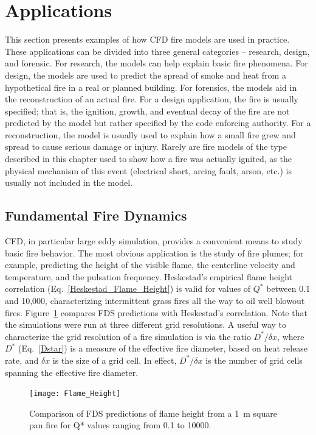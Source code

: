 \documentclass[graybox]{svmult}
\begin{document}
\section{Applications}

This section presents examples of how CFD fire models are used in practice. These applications can be divided into three general categories -- research, design, and forensic. For research, the models can help explain basic fire phenomena. For design, the models are used to predict the spread of smoke and heat from a hypothetical fire in a real or planned building. For forensics, the models aid in the reconstruction of an actual fire. For a design application, the fire is usually specified; that is, the ignition, growth, and eventual decay of the fire are not predicted by the model but rather specified by the code enforcing authority. For a reconstruction, the model is usually used to explain how a small fire grew and spread to cause serious damage or injury. Rarely are fire models of the type described in this chapter used to show how a fire was actually ignited, as the physical mechanism of this event (electrical short, arcing fault, arson, etc.) is usually not included in the model.

\subsection{Fundamental Fire Dynamics}

CFD, in particular large eddy simulation, provides a convenient means to study basic fire behavior. The most obvious application is the study of fire plumes; for example, predicting the height of the visible flame, the centerline velocity and temperature, and the pulsation frequency. Heskestad's empirical flame height correlation (Eq.~\ref{Heskestad_Flame_Height}) is valid for values of  $Q^*$ between 0.1 and 10,000, characterizing intermittent grass fires all the way to oil well blowout fires. Figure~\ref{Flame_Height} compares FDS predictions with Heskestad's correlation. Note that the simulations were run at three different grid resolutions. A useful way to characterize the grid resolution of a fire simulation is via the ratio $D^*/\delta x$, where $D^*$ (Eq.~\ref{Dstar}) is a measure of the effective fire diameter, based on heat release rate, and $\delta x$ is the size of a grid cell. In effect, $D^*/\delta x$ is the number of grid cells spanning the effective fire diameter.
\begin{figure}[ht]
\begin{center}
\texttt{[image: Flame\_Height]}
\end{center}
\caption{Comparison of FDS predictions of flame height from a 1~m square pan fire for Q* values ranging from
0.1 to 10000.}
\label{Flame_Height}
\end{figure}
\end{document}
